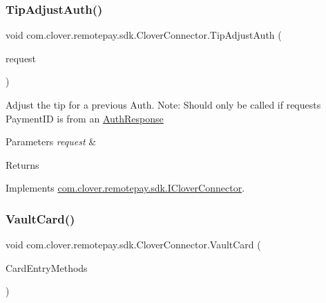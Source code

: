 \subsubsection{\texorpdfstring{Tip\+Adjust\+Auth()}{TipAdjustAuth()}}
{\footnotesize\ttfamily void com.\+clover.\+remotepay.\+sdk.\+Clover\+Connector.\+Tip\+Adjust\+Auth (\begin{DoxyParamCaption}\item[{\hyperlink{classcom_1_1clover_1_1remotepay_1_1sdk_1_1_tip_adjust_auth_request}{Tip\+Adjust\+Auth\+Request}}]{request }\end{DoxyParamCaption})}



Adjust the tip for a previous Auth. Note\+: Should only be called if request\textquotesingle{}s Payment\+ID is from an \hyperlink{classcom_1_1clover_1_1remotepay_1_1sdk_1_1_auth_response}{Auth\+Response} 


\begin{DoxyParams}{Parameters}
{\em request} & \\
\hline
\end{DoxyParams}
\begin{DoxyReturn}{Returns}

\end{DoxyReturn}


Implements \hyperlink{interfacecom_1_1clover_1_1remotepay_1_1sdk_1_1_i_clover_connector_a815c8be2012ebda06247c059771717cc}{com.\+clover.\+remotepay.\+sdk.\+I\+Clover\+Connector}.

\mbox{\label{classcom_1_1clover_1_1remotepay_1_1sdk_1_1_clover_connector_a26e95230422276f47542882628b5038f}} 
\subsubsection{\texorpdfstring{Vault\+Card()}{VaultCard()}}
{\footnotesize\ttfamily void com.\+clover.\+remotepay.\+sdk.\+Clover\+Connector.\+Vault\+Card (\begin{DoxyParamCaption}\item[{int?}]{Card\+Entry\+Methods }\end{DoxyParamCaption})}



